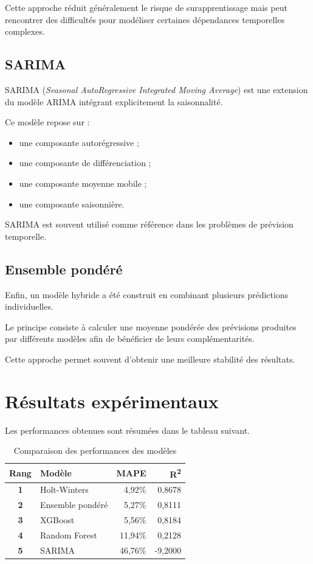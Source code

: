 \documentclass[12pt,a4paper,twoside]{report}
\begin{document}
Cette approche réduit généralement le risque de surapprentissage mais peut rencontrer des difficultés pour modéliser certaines dépendances temporelles complexes.

\subsection{SARIMA}

SARIMA (\textit{Seasonal AutoRegressive Integrated Moving Average}) est une extension du modèle ARIMA intégrant explicitement la saisonnalité.

Ce modèle repose sur :

\begin{itemize}
    \item une composante autorégressive ;
    \item une composante de différenciation ;
    \item une composante moyenne mobile ;
    \item une composante saisonnière.
\end{itemize}

SARIMA est souvent utilisé comme référence dans les problèmes de prévision temporelle.

\subsection{Ensemble pondéré}

Enfin, un modèle hybride a été construit en combinant plusieurs prédictions individuelles.

Le principe consiste à calculer une moyenne pondérée des prévisions produites par différents modèles afin de bénéficier de leurs complémentarités.

Cette approche permet souvent d'obtenir une meilleure stabilité des résultats.

\section{Résultats expérimentaux}

Les performances obtenues sont résumées dans le tableau suivant.

\begin{table}[H]
\centering
{}
\begin{tabular}{>{\bfseries}c l r r}
\toprule
\rowcolor{TableHeader}
\color{white}Rang & \color{white}Modèle & \color{white}MAPE & \color{white}R\textsuperscript{2} \\
\midrule
1 & Holt-Winters & 4,92\% & 0,8678 \\
2 & Ensemble pondéré & 5,27\% & 0,8111 \\
3 & XGBoost & 5,56\% & 0,8184 \\
4 & Random Forest & 11,94\% & 0,2128 \\
5 & SARIMA & 46,76\% & -9,2000 \\
\bottomrule
\end{tabular}
\caption{Comparaison des performances des modèles}
\label{tab:forecast-results}
\end{table}
\end{document}

